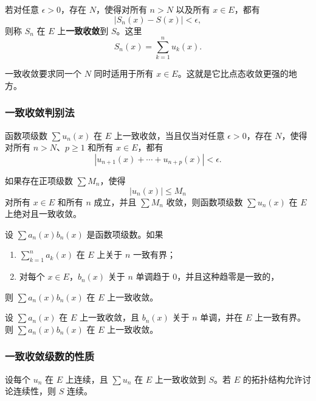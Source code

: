 \begin{definition}[一致收敛]
若对任意 $\epsilon>0$，存在 $N$，使得对所有 $n>N$ 以及所有 $x\in E$，都有
\[
    |S_n(x)-S(x)|<\epsilon,
\]
则称 $S_n$ 在 $E$ 上\textbf{一致收敛}到 $S$。这里
\[
    S_n(x)=\sum_{k=1}^{n}u_k(x).
\]
\end{definition}

一致收敛要求同一个 $N$ 同时适用于所有 $x\in E$。这就是它比点态收敛更强的地方。

\subsubsection{一致收敛判别法}

\begin{theorem}[一致 Cauchy 准则]
函数项级数 $\sum u_n(x)$ 在 $E$ 上一致收敛，当且仅当对任意 $\epsilon>0$，存在 $N$，使得对所有 $n>N$、$p\geq1$ 和所有 $x\in E$，都有
\[
    |u_{n+1}(x)+\cdots+u_{n+p}(x)|<\epsilon.
\]
\end{theorem}

\begin{theorem}
如果存在正项级数 $\sum M_n$，使得
\[
    |u_n(x)|\leq M_n
\]
对所有 $x\in E$ 和所有 $n$ 成立，并且 $\sum M_n$ 收敛，则函数项级数 $\sum u_n(x)$ 在 $E$ 上绝对且一致收敛。
\end{theorem}

\begin{theorem}
设 $\sum a_n(x)b_n(x)$ 是函数项级数。如果
\begin{enumerate}
    \item $\sum_{k=1}^{n}a_k(x)$ 在 $E$ 上关于 $n$ 一致有界；
    \item 对每个 $x\in E$，$b_n(x)$ 关于 $n$ 单调趋于 $0$，并且这种趋零是一致的，
\end{enumerate}
则 $\sum a_n(x)b_n(x)$ 在 $E$ 上一致收敛。
\end{theorem}

\begin{theorem}
设 $\sum a_n(x)$ 在 $E$ 上一致收敛，且 $b_n(x)$ 关于 $n$ 单调，并在 $E$ 上一致有界。则 $\sum a_n(x)b_n(x)$ 在 $E$ 上一致收敛。
\end{theorem}

\subsubsection{一致收敛级数的性质}

\begin{theorem}[连续性的保持]
设每个 $u_n$ 在 $E$ 上连续，且 $\sum u_n$ 在 $E$ 上一致收敛到 $S$。若 $E$ 的拓扑结构允许讨论连续性，则 $S$ 连续。
\end{theorem}

